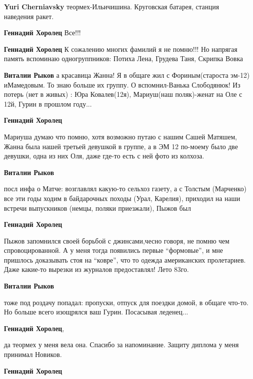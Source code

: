 \begin{itemize}
\begin{itemize}
\begin{itemize}
\textbf{Yuri Cherniavsky} теормех-Ильичишина. Круговская батарея, станция наведения ракет.

\textbf{Геннадий Хоролец} Все!!!

\textbf{Геннадий Хоролец} К сожалению многих фамилий я не помню!!! Но напрягая память вспоминаю одногруппников: Потиха Лена, Грудева Таня, Скрипка Вовка

\textbf{Виталии Рыков} а красавица Жанна! Я в общаге жил с Фориным(староста эм-12) иМамедовым. То знаю больше их группу. О вспомнил-Ванька Слободянюк! Из потерь (нет в живых) : Юра Ковалев(12я), Мариуш(наш поляк)-женат на Оле с 12й, Гурин в прошлом году...

\textbf{Геннадий Хоролец} 

Мариуша думаю что помню, хотя возможно путаю с нашим Сашей Матяшем, Жанна была
нашей третьей девушкой в группе, а в ЭМ 12 по-моему было две девушки, одна из них
Оля, даже где-то есть с ней фото из колхоза.


\textbf{Виталии Рыков} 

посл инфа о Матче: возглавлял какую-то сельхоз газету, а с Толстым (Марченко) все
эти годы ходим в байдарочных походы (Урал, Карелия), приходил на наши встречи
выпускников (немцы, поляки приезжали), Пыжов был

\textbf{Геннадий Хоролец} 

Пыжов запомнился своей борьбой с джинсами,чесно говоря, не помню чем
спровоцированной. А у меня тогда появились первые \enquote{формовые}, и мне пришлось
доказывать стоя на \enquote{ковре}, что то одежда американских пролетариев. Даже
какие-то вырезки из журналов предоставлял! Лето 83го.

\textbf{Виталии Рыков} 

тоже под роздачу попадал: пропуски, отпуск для поездки домой, в общаге что-то. Но
больше всего изощрялся ваш Гурин. Посасывая леденец...

\end{itemize} %

\textbf{Геннадий Хоролец}, 

да теормех у меня вела она. Спасибо за напоминание. Защиту диплома у меня
принимал Новиков.

\begin{itemize} %
\textbf{Геннадий Хоролец} 


\end{itemize}
\end{itemize}
\end{itemize}
